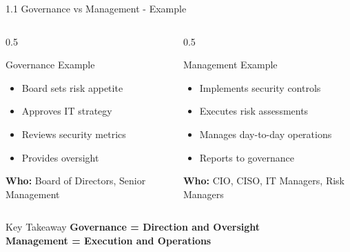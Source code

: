 \documentclass[10pt]{beamer}  %
\begin{document}
	\begin{frame}{1.1 Governance vs Management - Example}
		\begin{columns}
			\begin{column}{0.5\textwidth}
				\begin{block}{Governance Example}
					\begin{itemize}
						\item Board sets risk appetite
						\item Approves IT strategy
						\item Reviews security metrics
						\item Provides oversight
					\end{itemize}
					\vspace{0.3cm}
					\textbf{Who:} Board of Directors, Senior Management
				\end{block}
			\end{column}
			\begin{column}{0.5\textwidth}
				\begin{block}{Management Example}
					\begin{itemize}
						\item Implements security controls
						\item Executes risk assessments
						\item Manages day-to-day operations
						\item Reports to governance
					\end{itemize}
					\vspace{0.3cm}
					\textbf{Who:} CIO, CISO, IT Managers, Risk Managers
				\end{block}
			\end{column}
		\end{columns}
		
		\begin{exampleblock}{Key Takeaway}
			\centering
			\textbf{Governance = Direction and Oversight} \\
			\textbf{Management = Execution and Operations}
		\end{exampleblock}
	\end{frame}
	
\end{document}
